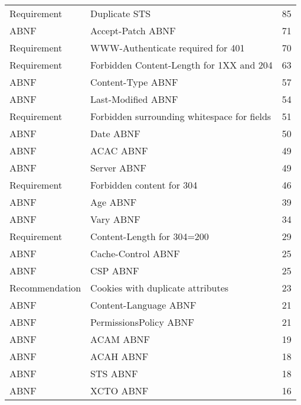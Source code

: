 \begin{tabular}{llr}
   Requirement &                               Duplicate STS &       85 \\
          ABNF &                           Accept-Patch ABNF &       71 \\
   Requirement &           WWW-Authenticate required for 401 &       70 \\
   Requirement &    Forbidden Content-Length for 1XX and 204 &       63 \\
          ABNF &                           Content-Type ABNF &       57 \\
          ABNF &                          Last-Modified ABNF &       54 \\
   Requirement & Forbidden surrounding whitespace for fields &       51 \\
          ABNF &                                   Date ABNF &       50 \\
          ABNF &                                   ACAC ABNF &       49 \\
          ABNF &                                 Server ABNF &       49 \\
   Requirement &                   Forbidden content for 304 &       46 \\
          ABNF &                                    Age ABNF &       39 \\
          ABNF &                                   Vary ABNF &       34 \\
   Requirement &                  Content-Length for 304=200 &       29 \\
          ABNF &                          Cache-Control ABNF &       25 \\
          ABNF &                                    CSP ABNF &       25 \\
Recommendation &           Cookies with duplicate attributes &       23 \\
          ABNF &                       Content-Language ABNF &       21 \\
          ABNF &                      PermissionsPolicy ABNF &       21 \\
          ABNF &                                   ACAM ABNF &       19 \\
          ABNF &                                   ACAH ABNF &       18 \\
          ABNF &                                    STS ABNF &       18 \\
          ABNF &                                   XCTO ABNF &       16 \\

\end{tabular}
